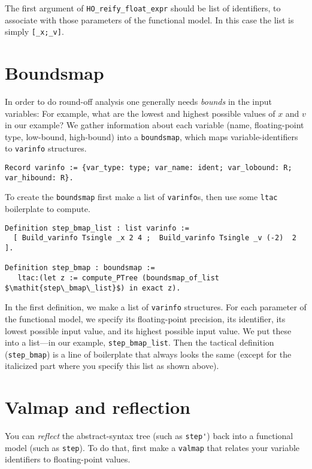 \documentclass[article]{memoir}
\begin{document}
The first argument of \lstinline{HO_reify_float_expr}
should be list of identifiers, to associate with those
parameters of the functional model.  In this case the list is
simply \lstinline{[_x;_v]}.

\chapter{Boundsmap}

In order to do round-off analysis one generally needs \emph{bounds}
in the input variables:
For example, what are the lowest and highest possible
values of $x$ and $v$ in our example?
We gather information about each variable
(name, floating-point type, low-bound, high-bound) into
a \lstinline{boundsmap}, which maps variable-identifiers to
\lstinline{varinfo} structures.
\begin{lstlisting}
Record varinfo := {var_type: type; var_name: ident; var_lobound: R; var_hibound: R}.
\end{lstlisting}

To create the \lstinline{boundsmap}
first make a list of \lstinline{varinfo}s,
then use some \lstinline{ltac} boilerplate to compute.
\begin{lstlisting}
Definition step_bmap_list : list varinfo := 
  [ Build_varinfo Tsingle _x 2 4 ;  Build_varinfo Tsingle _v (-2)  2 ].

Definition step_bmap : boundsmap :=
   ltac:(let z := compute_PTree (boundsmap_of_list $\mathit{step\_bmap\_list}$) in exact z).
\end{lstlisting}
In the first definition, we make a list of \lstinline{varinfo} structures.
For each parameter of the functional model, we specify its floating-point precision, its identifier, its lowest possible input value,
and its highest possible input value.  
We put these into a list---in our example, \lstinline{step_bmap_list}.
Then the tactical definition (\lstinline{step_bmap}) is
a line of boilerplate that always looks the same
(except for the italicized part where you specify this list
as shown above).


\chapter{Valmap and reflection}
\label{valmap}

You can \emph{reflect} the abstract-syntax tree (such as \lstinline{step'})
back into a functional model (such as \lstinline{step}).
To do that, first make a \lstinline{valmap} that relates your
variable identifiers to floating-point values.
\end{document}

